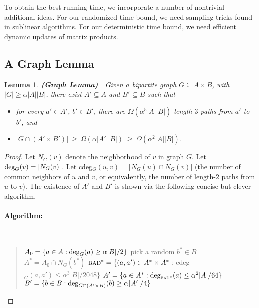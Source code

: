 \documentclass[11pt]{article}
\newtheorem{lemma}[theorem]{Lemma}
\begin{document}
{To obtain the
best running time, we incorporate a number of
nontrivial additional ideas.  For our randomized time bound,
we need sampling tricks found in sublinear algorithms.
For our deterministic time bound, we need efficient dynamic updates
of matrix products.


\subsection{A Graph Lemma}\label{sec-graph}

\begin{lemma} {\bf (Graph Lemma)}\ \ Given a bipartite graph $G\subseteq A \times B$, with $|G| \geq \alpha |A||B|$, there exist $A'\subseteq A$ and $B'\subseteq B$ such that

\begin{itemize}
\item[\rm (i)]  for every $a' \in A'$, $b' \in B'$, there are $\Omega(\alpha^5 |A||B|)$ length-$3$
       paths from $a'$ to $b'$, and
\item[\rm (ii)] $|G\cap (A'\times B')| \:\geq\: \Omega(\alpha |A'||B|) \:\geq\: \Omega(\alpha^2 |A||B|)$.
\end{itemize}
\end{lemma}

\begin{proof}

Let $N_G(v)$ denote the neighborhood of $v$ in graph $G$.  Let $\textrm{deg}_G(v) = |N_G(v)|$.
Let cdeg$_G(u,v) = |N_G(u)\cap N_G(v)|$
(the number of common neighbors of $u$ and $v$, or equivalently,
the number of length-$2$ paths from $u$ to $v$).
The existence of $A'$ and $B'$ is shown via the following
concise but clever algorithm.

\paragraph{Algorithm:}
\


\begin{quote}
\begin{algorithmic}[1]

 \State  $A_0 = \{a \in A: \textrm{deg}_G(a) \geq \alpha |B|/2\}$
 \Repeat
 \State pick a random $b^* \in B$
 \State $A^* = A_0\cap N_G(b^*)$
 \State $\textsc{bad}^* = \{(a,a') \in A^*\times A^*:$ cdeg$_G(a,a') \leq \alpha^3 |B|/2048\}$
 \State $A' = \{a \in A^*: \textrm{deg}_{\textsc{bad}^*}(a) \leq \alpha^2 |A|/64\}$
 \State $B' = \{b \in B: \textrm{deg}_{G\cap (A'\times B)}(b) \geq \alpha |A'|/4\}$
 \end{algorithmic}
\end{quote}


\end{proof}}
\end{document}
